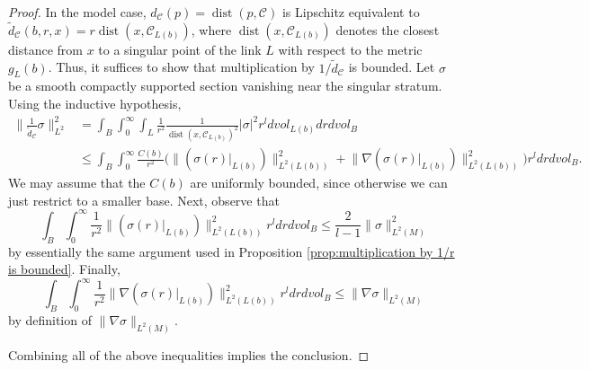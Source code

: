 \documentclass[12pt, reqno]{amsart}
\theoremstyle{plain} %
\theoremstyle{definition}
\theoremstyle{remark}
\numberwithin{equation}{section}
\newcommand{\norm}[1]{\lVert #1 \rVert}
\newcommand{\pnorm}[1]{| #1 |}
\newcommand{\cat}[1]{\mathcal{#1}}
\newcommand{\ldim}{l} %
\DeclareMathOperator{\dist}{dist}
\begin{document}
\begin{proof}
    In the model case, \(d_\cat{C}(p) = \dist(p, \cat{C})\) is Lipschitz equivalent to \(\tilde{d}_\cat{C}(b,r,x) = r \dist(x, \cat{C}_{L(b)})\), where \(\dist(x, \cat{C}_{L(b)})\) denotes the closest distance from \(x\) to a singular point of the link \(L\) with respect to the metric \(g_L(b)\).
    Thus, it suffices to show that multiplication by \(1/\tilde{d}_\cat{C}\) is bounded.
    Let \(\sigma\) be a smooth compactly supported section vanishing near the singular stratum.
    Using the inductive hypothesis,
    \begin{align*}
        \norm{\frac{1}{\tilde{d}_\cat{C}} \sigma}_{L^2}^2 &= \int_B \int_0^\infty \int_L \frac{1}{r^2}\frac{1}{\dist(x, \cat{C}_{L(b)})^2} \pnorm{\sigma}^2 r^\ldim dvol_{L(b)} dr dvol_B \\
        & \leq \int_B \int_0^\infty \frac{C(b)}{r^2}\big(\norm{(\sigma(r)|_{L(b)})}_{L^2(L(b))}^2 + \norm{\nabla (\sigma(r)|_{L(b)})}_{L^2(L(b))}^2\big) r^\ldim dr dvol_B.
    \end{align*}
    We may assume that the \(C(b)\) are uniformly bounded, since otherwise we can just restrict to a smaller base.
    Next, observe that
    \begin{equation*}
        \int_B \int_0^\infty \frac{1}{r^2}\norm{(\sigma(r)|_{L(b)})}_{L^2(L(b))}^2 r^\ldim dr dvol_B \leq \frac{2}{l-1}\norm{\sigma}_{L^2(M)}^2
    \end{equation*}
    by essentially the same argument used in Proposition \ref{prop:multiplication by 1/r is bounded}.
    Finally,
    \begin{equation*}
        \int_B \int_0^\infty \frac{1}{r^2}\norm{\nabla (\sigma(r)|_{L(b)})}_{L^2(L(b))}^2 r^\ldim dr dvol_B \leq \norm{\nabla \sigma}_{L^2(M)}
    \end{equation*}
    by definition of \(\norm{\nabla \sigma}_{L^2(M)}\).

    Combining all of the above inequalities implies the conclusion.
\end{proof}
\end{document}

